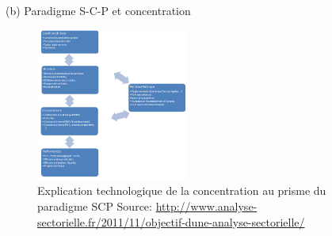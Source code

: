 \begin{frame}[allowframebreaks]{(b) Paradigme S-C-P et concentration}
\begin{itemize}
\begin{enumerate}[-]
    \begin{figure}[h]
    \includegraphics[width=5cm]{Analyse-Sectorielle-Modele-SCP.png}
    \caption{Explication technologique de la concentration au prisme du paradigme SCP
    \protect\linebreak
        Source: \url{http://www.analyse-sectorielle.fr/2011/11/objectif-dune-analyse-sectorielle/}}
    \end{figure}
   \end{enumerate}
\end{itemize}
\end{frame}


